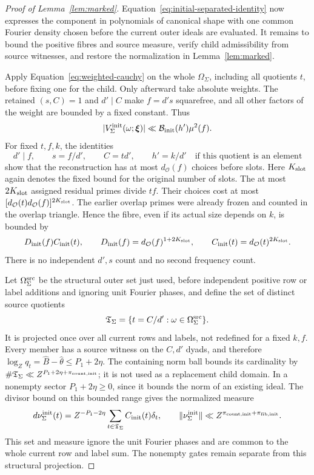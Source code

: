\documentclass[11pt,a4paper]{article}
\numberwithin{equation}{section}
\numberwithin{figure}{section}
\theoremstyle{definition}
\theoremstyle{remark}
\begin{document}
\begin{proof}[Proof of Lemma~\ref{lem:marked}]
Equation~\eqref{eq:initial-separated-identity} now expresses the component
in polynomials of canonical shape with one common Fourier density chosen
before the current outer ideals are evaluated.  It remains to bound the
positive fibres and source measure, verify child admissibility from source
witnesses, and restore the normalization in Lemma~\ref{lem:marked}.

Apply Equation~\eqref{eq:weighted-cauchy} on the whole
\(\Omega_\Sigma\), including all quotients \(t\), before fixing one
for the child.  Only afterward take absolute weights.  The retained
\((s,C)=1\) and \(d'\mid C\) make \(f=d's\) squarefree, and all
other factors of the weight are bounded by a fixed constant.  Thus
\[
 |V_\Sigma^{\rm init}(\omega;\boldsymbol\xi)|
 \ll\mathcal B_{\rm init}(h')\mu^2(f).
\]
For fixed \(t,f,k\), the identities
\[
 d'\mid f,\qquad s=f/d',\qquad C=td',\qquad h'=k/d'
       \quad\text{if this quotient is an element}
\]
show that the reconstruction has at most \(d_{\mathcal O}(f)\)
choices before slots.  Here \(K_{\rm slot}\) again denotes the fixed
bound for the original number of slots.  The at most \(2K_{\rm slot}\) assigned
residual primes divide \(tf\).  Their choices cost at most
\([d_{\mathcal O}(t)d_{\mathcal O}(f)]^{2K_{\rm slot}}\).
The earlier overlap primes were already frozen and counted in the
overlap triangle.  Hence the fibre, even if its actual size depends
on \(k\), is bounded by
\begin{equation}\label{eq:initial-fibre}
 D_{\rm init}(f)C_{\rm init}(t),\qquad
 D_{\rm init}(f)=d_{\mathcal O}(f)^{1+2K_{\rm slot}},\qquad
 C_{\rm init}(t)=d_{\mathcal O}(t)^{2K_{\rm slot}}.
\end{equation}
There is no independent \(d',s\) count and no second frequency count.

Let \(\Omega_\Sigma^{\rm src}\) be the structural outer set just
used, before independent positive row or label additions and ignoring
unit Fourier phases, and define the set of distinct source quotients
\[
 \mathfrak T_\Sigma=\{t=C/d':\omega\in\Omega_\Sigma^{\rm src}\}.
\]
It is projected once over all current rows and labels, not redefined
for a fixed \(k,f\).  Every member has a source witness on the
\(C,d'\) dyads, and therefore
\(\log_Zq_t=\widehat B-\widehat\theta\le P_1+2\eta\).
The containing norm ball bounds its cardinality by
\(\#\mathfrak T_\Sigma\ll Z^{P_1+2\eta+\pi_{{\rm count},{\rm init}}}\);
it is not used as a replacement child domain.  In a nonempty sector
\(P_1+2\eta\ge0\), since it bounds the norm of an existing ideal.
The divisor bound on this bounded range gives the normalized measure
\begin{equation}\label{eq:initial-normalized-quotients}
 d\nu_\Sigma^{\rm init}(t)
 =Z^{-P_1-2\eta}\sum_{t\in\mathfrak T_\Sigma}C_{\rm init}(t)\delta_t,
 \qquad
 \|\nu_\Sigma^{\rm init}\|
 \ll Z^{\pi_{{\rm count},{\rm init}}+\pi_{{\rm fib},{\rm init}}}.
\end{equation}
This set and measure ignore the unit Fourier phases and are common
to the whole current row and label sum.  The nonempty gates remain
separate from this structural projection.


\end{proof}
\end{document}
